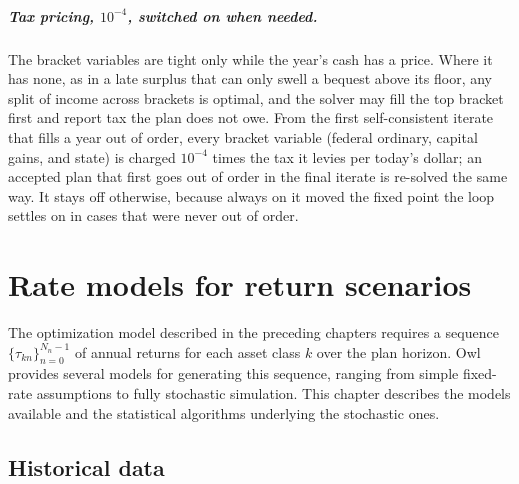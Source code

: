 \documentclass[fleqn,12pt]{report}
\begin{document}
\paragraph*{Tax pricing, $10^{-4}$, switched on when needed.}
The bracket variables are tight only while the year's cash has a price.  Where it has none,
as in a late surplus that can only swell a bequest above its floor, any split of income
across brackets is optimal, and the solver may fill the top bracket first and report tax the
plan does not owe.  From the first self-consistent iterate that fills a year out of order,
every bracket variable (federal ordinary, capital gains, and state) is charged $10^{-4}$ times
the tax it levies per today's dollar; an accepted plan that first goes out of order in the
final iterate is re-solved the same way.  It stays off otherwise, because always on it moved
the fixed point the loop settles on in cases that were never out of order.


\chapter{Rate models for return scenarios}
\label{Chap:RateModels}

The optimization model described in the preceding chapters requires a sequence
$\{\tau_{kn}\}_{n=0}^{N_n-1}$ of annual returns for each asset class $k$ over the plan
horizon.
Owl provides several models for generating this sequence, ranging from simple
fixed-rate assumptions to fully stochastic simulation.
This chapter describes the models available and the statistical algorithms
underlying the stochastic ones.

\section{Historical data}
\label{sec:historical-data}
\end{document}
